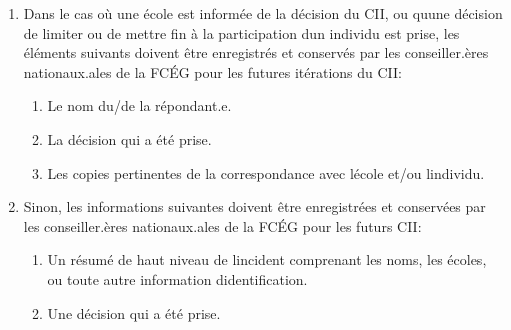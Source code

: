 \begin{enumerate}
 \item
  Dans le cas où une école est informée de la décision du CII, ou qu\textquotesingle une décision de limiter ou de mettre fin à la participation d\textquotesingle un individu est prise, les éléments suivants doivent être enregistrés et conservés par les conseiller.ères nationaux.ales de la FCÉG pour les futures itérations du CII:

  \begin{enumerate}
   \item
    Le nom du/de la répondant.e.
   \item
    La décision qui a été prise.
   \item
    Les copies pertinentes de la correspondance avec l\textquotesingle école et/ou l\textquotesingle individu.
  \end{enumerate}
 \item
  Sinon, les informations suivantes doivent être enregistrées et conservées par les conseiller.ères nationaux.ales de la FCÉG pour les futurs CII:

  \begin{enumerate}
   \item
    Un résumé de haut niveau de l\textquotesingle incident comprenant les noms, les écoles, ou toute autre information d\textquotesingle identification.
   \item
    Une décision qui a été prise.
  \end{enumerate}
\end{enumerate}

